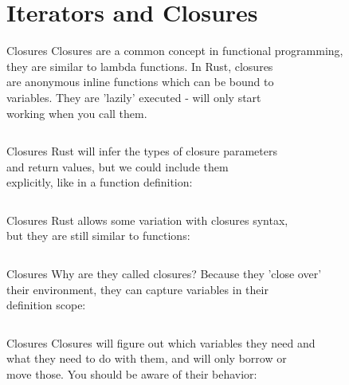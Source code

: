 \documentclass[usenames,dvipsnames,10pt,aspectratio=169]{beamer}
\begin{document}

\section{Iterators and Closures}

\begin{frame}{Closures}
	\large
	Closures are a common concept in functional programming,\\
	they are similar to lambda functions. In Rust, closures\\
	are anonymous inline functions which can be bound to\\
	variables. They are 'lazily' executed - will only start\\
	working when you call them.

	\vspace{0.5cm}
	\inputminted[fontsize=\Large]{rust}{code/closures1.rs}
\end{frame}

\begin{frame}{Closures}
	\large
	Rust will infer the types of closure parameters\\
	and return values, but we could include them\\
	explicitly, like in a function definition:\\
	\vspace{0.5cm}
	\inputminted[fontsize=\Large]{rust}{code/closures2.rs}
\end{frame}

\begin{frame}{Closures}
	\large
	Rust allows some variation with closures syntax,\\
	but they are still similar to functions:
	\vspace{0.5cm}
	\inputminted[fontsize=\Large]{rust}{code/closures3.rs}
\end{frame}

\begin{frame}{Closures}
	\large
	Why are they called closures? Because they 'close over'\\
	their environment, they can capture variables in their\\
	definition scope:\\
	\vspace{0.5cm}
	\inputminted[fontsize=\Large]{rust}{code/closures4.rs}
\end{frame}

\begin{frame}{Closures}
	\large
	Closures will figure out which variables they need and\\
	what they need to do with them, and will only borrow or\\
	move those. You should be aware of their behavior:\\
	\vspace{0.5cm}
	\inputminted[fontsize=\Large]{rust}{code/closures5.rs}
\end{frame}
\end{document}
